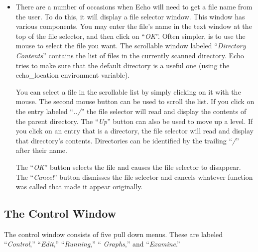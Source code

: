 \begin{itemize}
\item
{}
There are a number of occasions when Echo will need to get a file name
from the user. To do this, it will display a file selector window.
This window has various components. You may enter the file's name in
the text window at the top of the file selector, and then click on
``{\sl OK}''. Often simpler, is to use the mouse to select the file
you want. The scrollable window labeled ``{\sl Directory Contents}''
contains the list of files in the currently scanned directory. Echo
tries to make sure that the default directory is a useful one (using
the {\sc echo\_location} environment variable).

You can select a file in the scrollable list by simply clicking on it
with the mouse. The second mouse button can be used to scroll the
list. If you click on the entry labeled ``{\sl ../}'' the file
selector will read and display the contents of the parent directory.
The ``{\sl Up}'' button can also be used to move up a level.  If you
click on an entry that is a directory, the file selector will read and
display that directory's contents. Directories can be identified by
the trailing ``{\sl /}'' after their name.

The ``{\sl OK}'' button selects the file and causes the file selector
to disappear. The ``{\sl Cancel}'' button dismisses the file selector
and cancels whatever function was called that made it appear
originally. 

\end{itemize}


\subsection{The Control Window}

The control window consists of five pull down menus. These are labeled
``{\sl Control},'' ``{\sl Edit},'' ``{\sl Running},'' ``{\sl
Graphs},'' and ``{\sl Examine}.''

